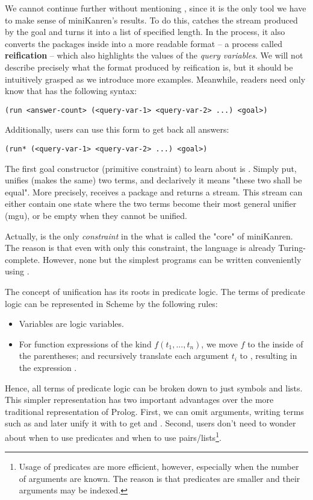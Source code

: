 We cannot continue further without mentioning , since it is the only tool we have to make sense of miniKanren's results. To do this,  catches the stream produced by the goal and turns it into a list of specified length. In the process, it also converts the packages inside into a more readable format -- a process called \textbf{reification} -- which also highlights the values of the \textit{query variables}. We will not describe precisely what the format produced by reification is, but it should be intuitively grasped as we introduce more examples. Meanwhile, readers need only know that  has the following syntax:
\lstset{language=Scheme, showstringspaces=false, breaklines=true}
\begin{lstlisting}
(run <answer-count> (<query-var-1> <query-var-2> ...) <goal>)
\end{lstlisting}

Additionally, users can use this form to get back all answers:
\begin{lstlisting}
(run* (<query-var-1> <query-var-2> ...) <goal>)
\end{lstlisting}

The first goal constructor (primitive constraint) to learn about is \code{==}.
Simply put, \code{==} unifies (makes the same) two terms, and declarively it means "these two shall be equal". More precisely, \code{==} receives a package and returns a stream. This stream can either contain one state where the two terms become their most general unifier (mgu), or be empty when they cannot be unified.

Actually, \code{==} is the only \textit{constraint} in the what is called the "core" of miniKanren. The reason is that even with only this constraint, the language is already Turing-complete. However, none but the simplest programs can be written conveniently using \code{==}.

The concept of unification has its roots in predicate logic. The terms of predicate logic can be represented in Scheme by the following rules:
\begin{itemize}
\item Variables are logic variables.
\item For function expressions of the kind $f(t_1,...,t_n)$, we move $f$ to the inside of the parentheses; and recursively translate each argument $t_i$ to , resulting in the expression .
\end{itemize}

Hence, all terms of predicate logic can be broken down to just symbols and lists. This simpler representation has two important advantages over the more traditional representation of Prolog. First, we can omit arguments, writing terms such as  and later unify it with  to get  and . Second, users don't need to wonder about when to use predicates and when to use pairs/lists\footnote{Usage of predicates are more efficient, however, especially when the number of arguments are known. The reason is that predicates are smaller and their arguments may be indexed.}.

